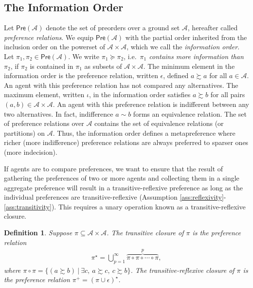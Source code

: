 \documentclass[conference]{ieeeconf}
\newcommand{\A}{\mathcal{A}}
\newcommand{\Pref}{\mathsf{Pre}}
\newcommand{\prefers}{\succsim}
\newtheorem{definition}{Definition}
\begin{document}
\subsection{The Information Order}

Let $\Pref(\A)$ denote the set of preorders over a ground set $\A$, hereafter called \emph{preference relations}. We equip $\Pref(\A)$ with the partial order inherited from the inclusion order on the powerset of $\A \times \A$, which we call the \emph{information order}. Let $\pi_1, \pi_2 \in \Pref(\A)$. We write $\pi_1 \succeq \pi_2$, i.e.~{\it $\pi_1$ contains more information than $\pi_2$}, if $\pi_2$ is contained in $\pi_1$ as subsets of $\A \times \A$. The minimum element in the information order is the preference relation, written $\epsilon$, defined $a \prefers a$ for all $a \in \A$. An agent with this preference relation has not compared any alternatives. The maximum element, written $\iota$, in the information order satisfies $a \prefers b$ for all pairs $(a,b) \in \A \times \A$. An agent with this preference relation is indifferent between any two alternatives. In fact, indifference $a \sim b$ forms an equivalence relation. The set of preference relations over $\A$ contains the set of equivalence relations (or partitions) on $\A$. Thus, the information order defines a metapreference where richer (more indifference) preference relations are always preferred to sparser ones (more indecision).

If agents are to compare preferences, we want to ensure that the result of gathering the preferences of two or more agents and collecting them in a single aggregate preference will result in a transitive-reflexive preference as long as the individual preferences are transitive-reflexive (Assumption \ref{ass:reflexivity}-\ref{ass:transitivity}). This requires a unary operation known as a transitive-reflexive closure.
\begin{definition}
    Suppose $\pi \subseteq \A \times \A$. The \emph{transitive closure} of $\pi$ is the preference relation 
\begin{align}
    \pi^{\star} = \bigcup_{p=1}^{\infty} \overbrace{\pi \circ \pi \circ \cdots \circ \pi}^{p}, \label{eq:transitive-closure}
\end{align}
where $\pi \circ \pi = \{ (a \prefers b)~\vert~\exists c,~a \prefers c,~c \prefers b\}$. The \emph{transitive-reflexive closure} of $\pi$ is the preference relation $\pi^{+} = \left( \pi \cup \epsilon \right)^\star$.
\end{definition}
\end{document}
